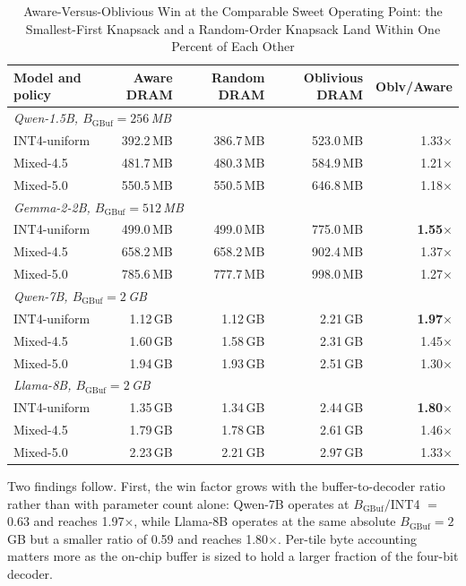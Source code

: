 \documentclass{ieeeaccess}
\begin{document}
\begin{table}[t]
\caption{Aware-Versus-Oblivious Win at the Comparable Sweet Operating Point: the Smallest-First Knapsack and a Random-Order Knapsack Land Within One Percent of Each Other}
\label{tab:cross_model}
\centering
\small
\begin{tabular}{lrrrr}
\toprule
Model and policy   & Aware DRAM & Random DRAM & Oblivious DRAM & Oblv/Aware \\
\midrule
\multicolumn{5}{l}{\emph{Qwen-1.5B, $B_{\mathrm{GBuf}}\!=\!256$\,MB}} \\
\quad INT4-uniform  & 392.2\,MB & 386.7\,MB & 523.0\,MB & 1.33$\times$ \\
\quad Mixed-4.5     & 481.7\,MB & 480.3\,MB & 584.9\,MB & 1.21$\times$ \\
\quad Mixed-5.0     & 550.5\,MB & 550.5\,MB & 646.8\,MB & 1.18$\times$ \\
\midrule
\multicolumn{5}{l}{\emph{Gemma-2-2B, $B_{\mathrm{GBuf}}\!=\!512$\,MB}} \\
\quad INT4-uniform  & 499.0\,MB & 499.0\,MB & 775.0\,MB & \textbf{1.55$\times$} \\
\quad Mixed-4.5     & 658.2\,MB & 658.2\,MB & 902.4\,MB & 1.37$\times$ \\
\quad Mixed-5.0     & 785.6\,MB & 777.7\,MB & 998.0\,MB & 1.27$\times$ \\
\midrule
\multicolumn{5}{l}{\emph{Qwen-7B, $B_{\mathrm{GBuf}}\!=\!2$\,GB}} \\
\quad INT4-uniform  & 1.12\,GB  & 1.12\,GB  & 2.21\,GB  & \textbf{1.97$\times$} \\
\quad Mixed-4.5     & 1.60\,GB  & 1.58\,GB  & 2.31\,GB  & 1.45$\times$ \\
\quad Mixed-5.0     & 1.94\,GB  & 1.93\,GB  & 2.51\,GB  & 1.30$\times$ \\
\midrule
\multicolumn{5}{l}{\emph{Llama-8B, $B_{\mathrm{GBuf}}\!=\!2$\,GB}} \\
\quad INT4-uniform  & 1.35\,GB  & 1.34\,GB  & 2.44\,GB  & \textbf{1.80$\times$} \\
\quad Mixed-4.5     & 1.79\,GB  & 1.78\,GB  & 2.61\,GB  & 1.46$\times$ \\
\quad Mixed-5.0     & 2.23\,GB  & 2.21\,GB  & 2.97\,GB  & 1.33$\times$ \\
\bottomrule
\end{tabular}
\end{table}

Two findings follow. First, the win factor grows with the
buffer-to-decoder ratio rather than with parameter count alone: Qwen-7B
operates at $B_{\mathrm{GBuf}}/$INT4 $=$ 0.63 and reaches 1.97$\times$,
while Llama-8B operates at the same absolute
$B_{\mathrm{GBuf}}\!=\!2$\,GB but a smaller ratio of 0.59 and reaches
1.80$\times$. Per-tile byte accounting matters more as the on-chip
buffer is sized to hold a larger fraction of the four-bit decoder.
\end{document}
